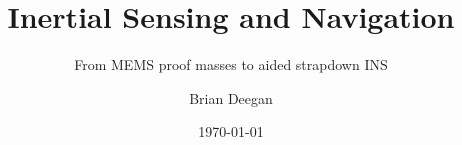 \documentclass[aspectratio=169]{beamer}
\title{Inertial Sensing and Navigation}
\subtitle{From MEMS proof masses to aided strapdown INS}
\author{Brian Deegan}
\institute{MSc Robotics}
\date{\today}
\begin{document}
\begin{frame}
  \titlepage
\end{frame}









\end{document}
